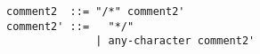 \begin{verbatim}
comment2  ::= "/*" comment2'
comment2' ::=   "*/"
              | any-character comment2'
\end{verbatim}
